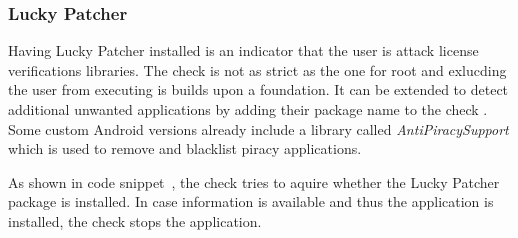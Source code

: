 \subsubsection{Lucky Patcher} \label{subsection:counter-improve-tampering-luckypatcher}
Having Lucky Patcher installed is an indicator that the user is attack license verifications libraries.
The check is not as strict as the one for root and exlucding the user from executing is builds upon a foundation.
It can be extended to detect additional unwanted applications by adding their package name to the check \cite{androidCrackingTools}.
Some custom Android versions already include a library called \textit{AntiPiracySupport} \cite{antipiracy} which is used to remove and blacklist piracy applications.
\newline

As shown in code snippet~, the check tries to aquire whether the Lucky Patcher package is installed.
In case information is available and thus the application is installed, the check stops the application.
